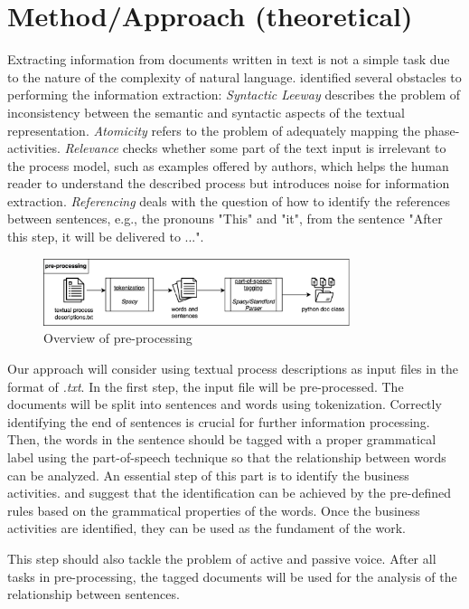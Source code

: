 \chapter{Method/Approach (theoretical)}
Extracting information from documents written in text is not a simple task due to the nature of the complexity of natural language. \cite{t2m_1} identified several obstacles to performing the information extraction: \textit{Syntactic Leeway} describes the problem of inconsistency between the semantic and syntactic aspects of the textual representation. \textit{Atomicity} refers to the problem of adequately mapping the phase-activities. \textit{Relevance} checks whether some part of the text input is irrelevant to the process model, such as examples offered by authors, which helps the human reader to understand the described process but introduces noise for information extraction. \textit{Referencing} deals with the question of how to identify the references between sentences, e.g., the pronouns "This" and "it", from the sentence "After this step, it will be delivered to ...".

\begin{figure}[h]
    \centering
    \caption{Overview of pre-processing}
    \includegraphics[width=0.8\textwidth]{tum-resources/images/theoretical_extraction_pre.png}
\end{figure}

Our approach will consider using textual process descriptions as input files in the format of \textit{.txt}. In the first step, the input file will be pre-processed. The documents will be split into sentences and words using tokenization. Correctly identifying the end of sentences is crucial for further information processing. Then, the words in the sentence should be tagged with a proper grammatical label using the part-of-speech technique so that the relationship between words can be analyzed. An essential step of this part is to identify the business activities. \cite{t2m_5} and \cite{complement_1} suggest that the identification can be achieved by the pre-defined rules based on the grammatical properties of the words. Once the business activities are identified, they can be used as the fundament of the work.


This step should also tackle the problem of active and passive voice. After all tasks in pre-processing, the tagged documents will be used for the analysis of the relationship between sentences.

